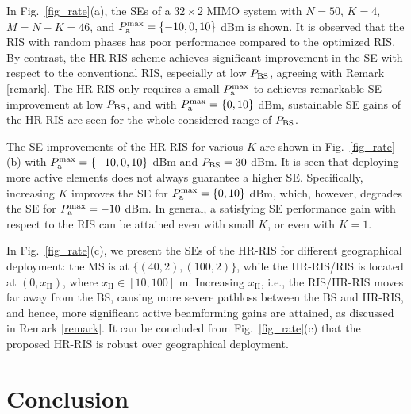 \documentclass[conference]{IEEEtran}
\begin{document}
	
	In Fig.\ \ref{fig_rate}(a), the SEs of a $32 \times 2$ MIMO system with $N=50$, $K = 4$, $M=N-K=46$, and $P_{\mathrm{a}}^{\mathrm{max}}=\{-10, 0, 10\}$ dBm is shown. It is observed that the RIS with random phases has poor performance compared to the optimized RIS. By contrast, the HR-RIS scheme achieves significant improvement in the SE with respect to the conventional RIS, especially at low $P_{\mathrm{BS}}$, agreeing with Remark \ref{remark}. The HR-RIS only requires a small $P_{\mathrm{a}}^{\mathrm{max}}$ to achieves remarkable SE improvement at low $P_{\mathrm{BS}}$, and with $P_{\mathrm{a}}^{\mathrm{max}} = \{0, 10\}$ dBm, sustainable SE gains of the HR-RIS are seen for the whole considered range of $P_{\mathrm{BS}}$. 
	
	The SE improvements of the HR-RIS for various $K$ are shown in Fig.\ \ref{fig_rate}(b) with $P_{\mathrm{a}}^{\mathrm{max}}=\{-10, 0, 10\}$ dBm and $P_{\mathrm{BS}} = 30$ dBm. It is seen that deploying more active elements does not always guarantee a higher SE. Specifically, increasing $K$ improves the SE for $P_{\mathrm{a}}^{\mathrm{max}}=\{0, 10\}$ dBm, which, however, degrades the SE for $P_{\mathrm{a}}^{\mathrm{max}}=-10$ dBm. In general, a satisfying SE performance gain with respect to the RIS can be attained even with small $K$, or even with $K=1$.
	
	In Fig.\ \ref{fig_rate}(c), we present the SEs of the HR-RIS for different geographical deployment: the MS is at $\{(40,2), (100,2)\}$, while the HR-RIS/RIS is located at $(0, x_{\mathrm{H}})$, where $x_{\mathrm{H}} \in [10, 100]$ m. Increasing $x_{\mathrm{H}}$, i.e., the RIS/HR-RIS moves far away from the BS, causing more severe pathloss between the BS and HR-RIS, and hence, more significant active beamforming gains are attained, as discussed in Remark \ref{remark}. It can be concluded from Fig.\ \ref{fig_rate}(c) that the proposed HR-RIS is robust over geographical deployment.
	
	
	
	\section{Conclusion}
	\label{sec_concusion}
	
\end{document}
